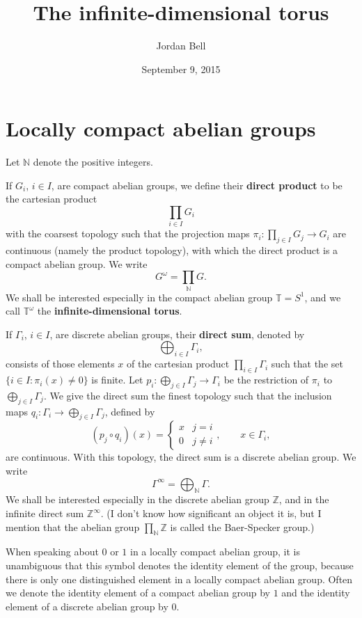 \documentclass{article}
\begin{document}
\title{The infinite-dimensional torus}
\author{Jordan Bell}
\date{September 9, 2015}
\maketitle

\section{Locally compact abelian groups}
Let $\mathbb{N}$ denote the positive integers.

If $G_i$, $i \in I$, are compact abelian groups, we define their \textbf{direct product} to be the cartesian product
\[
\prod_{i \in I} G_i
\]
with the coarsest topology such that the projection maps $\pi_i:\prod_{j \in I} G_j \to G_i$ are continuous (namely the product topology), with which 
the direct product is a compact abelian group. We write
\[
G^\omega = \prod_{\mathbb{N}} G.
\]
We shall be interested especially in the compact abelian group $\mathbb{T}=S^1$, and we call $\mathbb{T}^\omega$ the
\textbf{infinite-dimensional torus}.


If $\Gamma_i$, $i \in I$, are discrete abelian groups, their 
 \textbf{direct sum}, denoted by
 \[
\bigoplus_{i \in I} \Gamma_i,
\]
 consists of those elements $x$ of the cartesian product $\prod_{i \in I} \Gamma_i$  such that 
 the set $\{i \in I: \pi_i(x) \neq 0\}$ is finite. Let $p_i:\bigoplus_{j \in I} \Gamma_j \to \Gamma_i$ be the restriction of $\pi_i$ to $\bigoplus_{j \in I} \Gamma_j$.
   We give the direct sum the finest topology such that the inclusion maps
$q_i: \Gamma_i \to \bigoplus_{j \in I} \Gamma_j$, defined by
\[
(p_j \circ q_i)(x)=\begin{cases}
x&j=i\\
0&j \neq i
\end{cases}, \qquad x\in \Gamma_i,
\]
 are continuous. With this topology, the direct sum is a discrete abelian group. We write 
 \[
 \Gamma^\infty = \bigoplus_{\mathbb{N}} \Gamma.
 \]
 We shall be interested especially in the discrete abelian group $\mathbb{Z}$, and in the infinite direct sum $\mathbb{Z}^\infty$.
 (I don't know how significant an object it is, but I mention that the abelian group $\prod_{\mathbb{N}} \mathbb{Z}$ is
 called the Baer-Specker group.)
 
When speaking about $0$ or $1$ in a locally compact abelian group, it is unambiguous that this symbol denotes the identity element of the group,
because  there is only one distinguished element in a locally compact abelian group.
Often we denote the identity element of a compact abelian group by $1$
and the identity element of a discrete abelian group by $0$.
\end{document}
